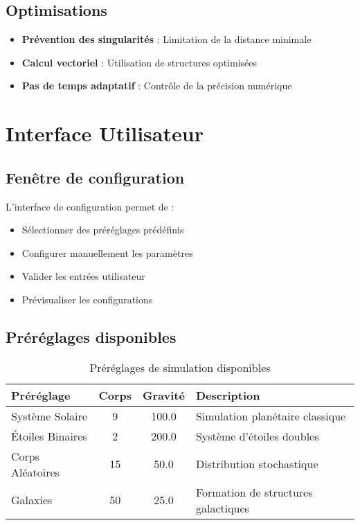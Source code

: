 \documentclass[12pt,a4paper]{article}
\begin{document}
\subsection{Optimisations}

\begin{itemize}
    \item \textbf{Prévention des singularités} : Limitation de la distance minimale
    \item \textbf{Calcul vectoriel} : Utilisation de structures optimisées
    \item \textbf{Pas de temps adaptatif} : Contrôle de la précision numérique
\end{itemize}

\section{Interface Utilisateur}

\subsection{Fenêtre de configuration}

L'interface de configuration permet de :

\begin{itemize}
    \item Sélectionner des préréglages prédéfinis
    \item Configurer manuellement les paramètres
    \item Valider les entrées utilisateur
    \item Prévisualiser les configurations
\end{itemize}

\subsection{Préréglages disponibles}

\begin{table}[h]
\centering
\begin{tabular}{|l|c|c|l|}
\hline
\textbf{Préréglage} & \textbf{Corps} & \textbf{Gravité} & \textbf{Description} \\
\hline
Système Solaire & 9 & 100.0 & Simulation planétaire classique \\
Étoiles Binaires & 2 & 200.0 & Système d'étoiles doubles \\
Corps Aléatoires & 15 & 50.0 & Distribution stochastique \\
Galaxies & 50 & 25.0 & Formation de structures galactiques \\
\hline
\end{tabular}
\caption{Préréglages de simulation disponibles}
\end{table}
\end{document}
